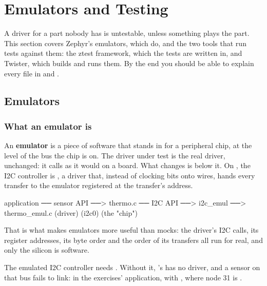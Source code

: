 
\section{Emulators and Testing}
\label{c5:sec:emulatorsandtestin}\label{c5:app:b}
A driver for a part nobody has is untestable, unless something plays the part. This section covers
Zephyr’s emulators, which do, and the two tools that run tests against them: the ztest framework,
which the tests are written in, and Twister, which builds and runs them. By the end you should be
able to explain every file in
 and
.

\subsection{Emulators}

\subsubsection{What an emulator is}
An \textbf{emulator} is a piece of software that stands in for a peripheral chip, at the level of
the bus the chip is on. The driver under test is the real driver, unchanged: it calls
 as it would on a board. What changes is below it. On
, the I2C controller  is , a driver
that, instead of clocking bits onto wires, hands every transfer to the emulator registered at the
transfer’s address.

\begin{console}
application ── sensor API ──> thermo.c ── I2C API ──> i2c_emul ──> thermo_emul.c
                              (driver)                (i2c0)       (the "chip")
\end{console}

That is what makes emulators more useful than mocks: the driver’s I2C calls, its register addresses,
its byte order and the order of its transfers all run for real, and only the silicon is software.

The emulated I2C controller needs . Without it, 's 
has no driver, and a sensor on that bus fails to link: in the exercises' application, with
, where node 31 is .

